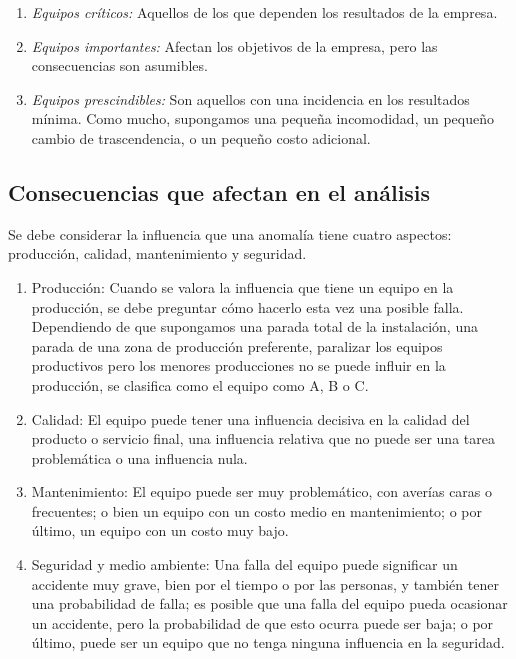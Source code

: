 \begin{enumerate}
    \item \emph{Equipos críticos:} Aquellos de los que dependen los resultados de la empresa.
\item \emph{Equipos importantes:} Afectan los objetivos de la empresa, pero las consecuencias son asumibles.
\item \emph{Equipos prescindibles:} Son aquellos con una incidencia en los resultados mínima. Como mucho, supongamos una pequeña incomodidad, un pequeño cambio de trascendencia, o un pequeño costo adicional.
\end{enumerate}
\subsection{Consecuencias que afectan en el análisis}
 Se debe considerar la influencia que una anomalía tiene cuatro aspectos: producción, calidad, mantenimiento y seguridad.
\begin{enumerate}
    \item  Producción:  Cuando se valora la influencia que tiene un equipo en la producción, se debe preguntar cómo hacerlo esta vez una posible falla. Dependiendo de que supongamos una parada total de la instalación, una parada de una zona de producción preferente, paralizar los equipos productivos pero los menores producciones no se puede influir en la producción, se clasifica como el equipo como A, B o C.

    \item  Calidad: El equipo puede tener una influencia decisiva en la calidad del producto o servicio final, una influencia relativa que no puede ser una tarea problemática o una influencia nula. 

    \item  Mantenimiento: El equipo puede ser muy problemático, con averías caras o frecuentes; o bien un equipo con un costo medio en mantenimiento; o por último, un equipo con un costo muy bajo. 

    \item Seguridad y medio ambiente:  Una falla del equipo puede significar un accidente muy grave, bien por el tiempo o por las personas, y también tener una probabilidad de falla; es posible que una falla del equipo pueda ocasionar un accidente, pero la probabilidad de que esto ocurra puede ser baja; o por último, puede ser un equipo que no tenga ninguna influencia en la seguridad. 
\end{enumerate}

